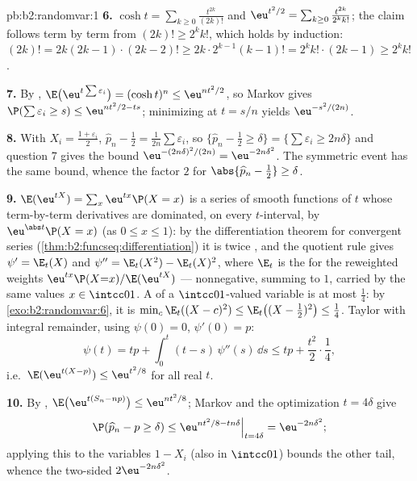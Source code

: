 \begin{solution}{pb:b2:randomvar:1}
\textbf{6.} $\cosh t = \sum_{k\geq0}\frac{t^{2k}}{(2k)!}$ and
$\eu^{t^2/2} = \sum_{k\geq0}\frac{t^{2k}}{2^kk!}$; the claim
follows term by term from $(2k)! \geq 2^kk!$, which holds by
induction: $(2k)! = 2k(2k-1)\cdot(2k-2)! \geq 2k\cdot
2^{k-1}(k-1)! = 2^kk!\cdot(2k-1) \geq 2^kk!$.

\textbf{7.} By , $\E\bigl(\eu^{t\sum\varepsilon_i}
\bigr) = (\cosh t)^n \leq \eu^{nt^2/2}$, so Markov gives
$\P(\sum\varepsilon_i \geq s) \leq \eu^{nt^2/2 - ts}$;
minimizing at $t = s/n$ yields $\eu^{-s^2/(2n)}$.

\textbf{8.} With $X_i = \frac{1 + \varepsilon_i}2$, $\widehat
p_n - \frac12 = \frac1{2n}\sum\varepsilon_i$, so
$\{\widehat p_n - \frac12 \geq \delta\} =
\{\sum\varepsilon_i \geq 2n\delta\}$ and question 7 gives the
bound $\eu^{-(2n\delta)^2/(2n)} = \eu^{-2n\delta^2}$. The
symmetric event has the same bound, whence the factor $2$ for
$\abs{\widehat p_n - \frac12} \geq \delta$.

\textbf{9.} $\E(\eu^{tX}) = \sum_x\eu^{tx}\P(X = x)$ is a
series of smooth functions of $t$ whose term-by-term
derivatives are dominated, on every  $t$-interval, by
$\eu^{\abs t}\P(X = x)$ (as $0 \leq x \leq 1$): by the
differentiation theorem for  convergent series
(\cref{thm:b2:funcseq:differentiation}) it is twice
, and the quotient rule gives $\psi' = \E_t(X)$
and $\psi'' = \E_t(X^2) - \E_t(X)^2$, where $\E_t$ is the
 for the reweighted weights
$\eu^{tx}\P(X{=}x)/\E(\eu^{tX})$ --- nonnegative, summing to
$1$, carried by the same values $x \in \intcc01$. A 
of a $\intcc01$-valued variable is at most $\frac14$: by
\cref{exo:b2:randomvar:6}, it is $\min_c\E_t((X - c)^2) \leq
\E_t\bigl((X - \tfrac12)^2\bigr) \leq \tfrac14$. Taylor with
integral remainder, using $\psi(0) = 0$, $\psi'(0) = p$:
\[
\psi(t) = tp + \int_0^t(t - s)\,\psi''(s)\,\dd s
\leq tp + \frac{t^2}2\cdot\frac14,
\]
i.e.\ $\E(\eu^{t(X - p)}) \leq \eu^{t^2/8}$ for all real $t$.

\textbf{10.} By , $\E\bigl(\eu^{t(S_n -
np)}\bigr) \leq \eu^{nt^2/8}$; Markov and the optimization $t
= 4\delta$ give
\[
\P(\widehat p_n - p \geq \delta)
\leq \eu^{nt^2/8 - tn\delta}\Big|_{t = 4\delta}
= \eu^{-2n\delta^2};
\]
applying this to the variables $1 - X_i$ (also in
$\intcc01$) bounds the other tail, whence the two-sided
$2\eu^{-2n\delta^2}$.


\end{solution}
